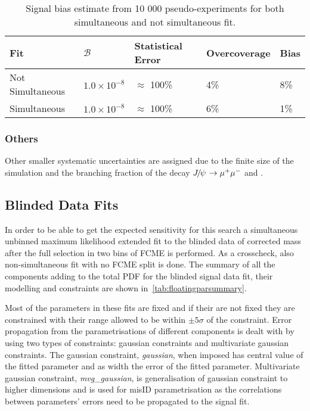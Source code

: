 \begin{table}[H]
\begin{center}
\begin{tabular}{ l  l  l  l  l }
\toprule
        Fit & $\mathcal{B}$ & Statistical Error & Overcoverage & Bias \\
\hline
        Not Simultaneous  & $1.0\times 10^{-8}$ & $\approx$ 100\% & 4\% & 8\%   \\
        Simultaneous  & $1.0\times 10^{-8}$ & $\approx$ 100\% & 6\% & 1\%   \\
\bottomrule
\end{tabular}
\end{center}
\caption{Signal bias estimate from 10 000 pseudo-experiments for both simultaneous and not simultaneous fit.}
\label{tab:biassum}
\end{table}


\subsubsection{Others}
Other smaller systematic uncertainties are assigned due to the finite size of the simulation and the branching fraction of the decay ${{J\mskip -3mu/\mskip -2mu\psi\mskip 2mu}} \rightarrow {\ensuremath{\mu^+\mu^-}}$ and \bjpsik.



\subsection{Blinded Data Fits}
\label{blindeddatafit}
In order to be able to get the expected sensitivity for this search a simultaneous unbinned maximum likelihood extended fit to the blinded data of corrected mass after the full selection in two bins of FCME is performed. As a crosscheck, also non-simultaneous fit with no FCME split is done. The summary of all the components adding to the total PDF for the blinded signal data fit, their modelling and constraints are shown in~\autoref{tab:floatingparsummary}.

Most of the parameters in these fits are fixed and if their are not fixed they are constrained with their range allowed to be within $\pm5\sigma$ of the constraint. Error propagation from the parametrisations of different components is dealt with by using two types of constraints: gaussian constraints and multivariate gaussian constraints. The gaussian constraint, \textit{gaussian}, when imposed has central value of the fitted parameter and as width the error of the fitted parameter. Multivariate gaussian constraint, \textit{mvg\_gaussian}, is generalisation of gaussian constraint to higher dimensions and is used for misID parametrisation as the correlations between parameters' errors need to be propagated to the signal fit.

